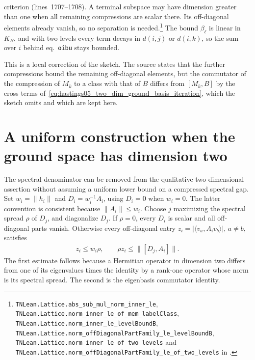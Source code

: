\documentclass{article}
\providecommand{\leanid}[1]{\nolinkurl{#1}}
\begin{document}
criterion (lines~1707--1708). A terminal subspace may have dimension greater than
one when all remaining compressions are scalar there. Its off-diagonal elements
already vanish, so no separation is needed.\footnote{\leanid{TNLean.Lattice.abs_sub_mul_norm_inner_le},
    \leanid{TNLean.Lattice.norm_inner_le_of_mem_labelClass},
    \leanid{TNLean.Lattice.norm_inner_le_levelBoundB},
    \leanid{TNLean.Lattice.norm_offDiagonalPartFamily_le_levelBoundB},
    \leanid{TNLean.Lattice.norm_inner_le_of_two_levels} and
    \leanid{TNLean.Lattice.norm_offDiagonalPartFamily_le_of_two_levels} in
    .}
The bound $\beta_\ell$ is linear in $K_B$, and with two levels every term decays
in $d(i,j)$ or $d(i,k)$, so the sum over $i$ behind eq.~\texttt{oibu} stays
bounded.

This is a local correction of the sketch. The source states that the further
compressions bound the remaining off-diagonal elements, but the commutator of
the compression of $M_k$ to a class with that of $B$ differs from $[M_k,B]$ by
the cross terms of~\eqref{eq:hastings05_two_dim_ground_basis_iteration}, which
the sketch omits and which are kept here.


\section{A uniform construction when the ground space has dimension two}

The spectral denominator can be removed from the qualitative two-dimensional
assertion without assuming a uniform lower bound on a compressed spectral gap.
Set $w_i=\|h_i\|$ and $D_i=w_i^{-1}A_i$, using $D_i=0$ when $w_i=0$.
The latter convention is consistent because $\|A_i\|\le w_i$.
Choose $j$ maximizing the spectral spread $\rho$ of $D_j$, and diagonalize $D_j$.
If $\rho=0$, every $D_i$ is scalar and all off-diagonal parts vanish.
Otherwise every off-diagonal entry $z_i=|\langle v_a,A_iv_b\rangle|$, $a\ne b$,
satisfies
\begin{align}
 z_i\le w_i\rho,
 \qquad \rho z_i\le \|[D_j,A_i]\|.
 \label{eq:hastings05_basis_normalized_bounds}
\end{align}
The first estimate follows because a Hermitian operator in dimension two differs
from one of its eigenvalues times the identity by a rank-one operator whose norm
is its spectral spread. The second is the eigenbasis commutator identity.
\end{document}
